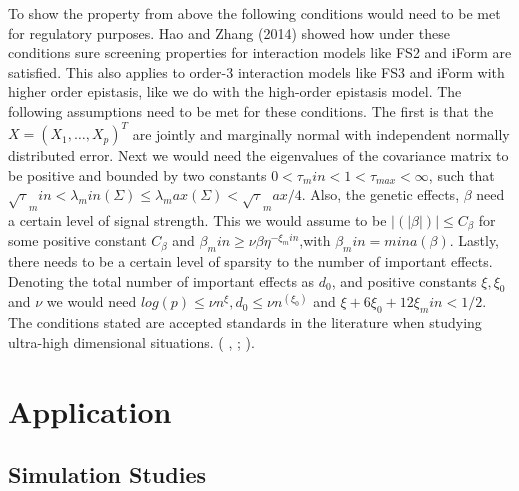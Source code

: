 \documentclass[11pt,]{book}
\theoremstyle{definition}
\theoremstyle{definition}
\theoremstyle{remark}
\begin{document}
To show the property from above the following conditions would need to
be met for regulatory purposes. Hao and Zhang (2014) showed how under
these conditions sure screening properties for interaction models like
FS2 and iForm are satisfied. This also applies to order-3 interaction
models like FS3 and iForm with higher order epistasis, like we do with
the high-order epistasis model. The following assumptions need to be met
for these conditions. The first is that the \(X=(X_1,…,X_p )^T\) are
jointly and marginally normal with independent normally distributed
error. Next we would need the eigenvalues of the covariance matrix to be
positive and bounded by two constants
\(0 < \tau_min < 1 < \tau_{max} < \infty\), such that
\(\sqrt{\tau}_min < \lambda_min (\Sigma)≤\lambda_max (\Sigma)< \sqrt{\tau}_max/4\).
Also, the genetic effects, \(\beta\) need a certain level of signal
strength. This we would assume to be \(|(|\beta|)| ≤ C_\beta\) for some
positive constant \(C_\beta\) and
\(\beta_min ≥ \nu\beta \eta^{-\xi_min}\),with \(\beta_min=mina(\beta)\).
Lastly, there needs to be a certain level of sparsity to the number of
important effects. Denoting the total number of important effects as
\(d_0\), and positive constants \(\xi,\xi_0\) and \(\nu\) we would need
\(log(p) ≤ \nu n^\xi,d_0 ≤ \nu n^(\xi_0)\) and \(ξ+6ξ_0+12ξ_min<1/2\).
The conditions stated are accepted standards in the literature when
studying ultra-high dimensional situations. (\cite{hao2014interaction} ,
\cite{fan2008sure}; \cite{sun2013genome}).

\section{Application}\label{application-1}

\subsection{Simulation Studies}\label{simulation-studies}
\end{document}
